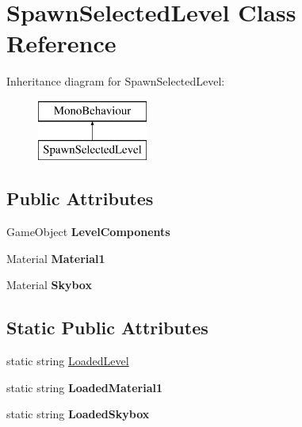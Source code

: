 \hypertarget{class_spawn_selected_level}{}\section{Spawn\+Selected\+Level Class Reference}
\label{class_spawn_selected_level}
Inheritance diagram for Spawn\+Selected\+Level\+:\begin{figure}[H]
\begin{center}
\leavevmode
\includegraphics[height=2.000000cm]{class_spawn_selected_level}
\end{center}
\end{figure}
\subsection*{Public Attributes}
\begin{DoxyCompactItemize}
\item 
Game\+Object {\bfseries Level\+Components}\hypertarget{class_spawn_selected_level_a604f58d67bb353137f526689fecd1738}{}\label{class_spawn_selected_level_a604f58d67bb353137f526689fecd1738}

\item 
Material {\bfseries Material1}\hypertarget{class_spawn_selected_level_a366848fc78a8c064b11ca751d3d6025a}{}\label{class_spawn_selected_level_a366848fc78a8c064b11ca751d3d6025a}

\item 
Material {\bfseries Skybox}\hypertarget{class_spawn_selected_level_a13d055e319c08c9e52f37d8b810889f0}{}\label{class_spawn_selected_level_a13d055e319c08c9e52f37d8b810889f0}

\end{DoxyCompactItemize}
\subsection*{Static Public Attributes}
\begin{DoxyCompactItemize}
\item 
static string \hyperlink{class_spawn_selected_level_a8d218aa712c1464b1e6a928e52cdb56f}{Loaded\+Level}
\item 
static string {\bfseries Loaded\+Material1}\hypertarget{class_spawn_selected_level_a47b76272906237a6f5eb652908cebda6}{}\label{class_spawn_selected_level_a47b76272906237a6f5eb652908cebda6}

\item 
static string {\bfseries Loaded\+Skybox}\hypertarget{class_spawn_selected_level_a572973e025315254b42897c1bf2d5f3e}{}\label{class_spawn_selected_level_a572973e025315254b42897c1bf2d5f3e}

\end{DoxyCompactItemize}


